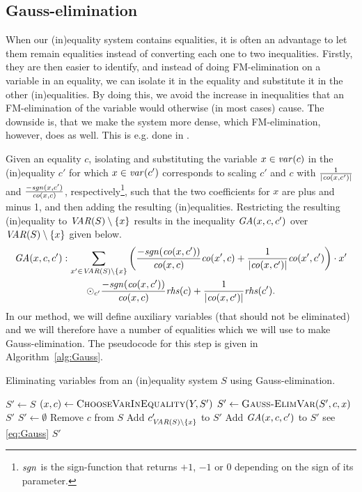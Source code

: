 \subsection{Gauss-elimination}
When our (in)equality system contains equalities, it is often an advantage to let them remain equalities instead of converting each one to two inequalities. Firstly, they are then easier to identify, and instead of doing FM-elimination on a variable in an equality, we can isolate it in the equality and substitute it in the other (in)equalities. By doing this, we avoid the increase in inequalities that an FM-elimination of the variable would otherwise (in most cases) cause. The downside is, that we make the system more dense, which FM-elimination, however, does as well. This is e.g. done in \cite{simon05}.

Given an equality $c$, isolating and substituting the variable $x\in \mathit{var}(c)$ in the (in)equality $c'$ for which $x\in\mathit{var}(c')$  
corresponds to scaling $c'$ and $c$ with $\frac{1}{|\mathit{co}(x,c')|}$ and $\frac{-\mathit{sgn}(x,c')}{\mathit{co}(x,c)}$, respectively\footnote{$\mathit{sgn}$ is the sign-function that returns $+1$, $-1$ or $0$ depending on the sign of its parameter.}, such that the two coefficients for $x$ are plus and minus 1, and then adding the resulting (in)equalities. Restricting the resulting (in)equality to $\mathit{VAR}(S)\setminus\{x\}$ results in the inequality $\mathit{GA}(x,c,c')$ over $\mathit{VAR}(S)\setminus\{x\}$ given below.
\begin{multline}
\label{eq:Gauss}
\mathit{GA}(x,c,c'):
\sum_{x'\in\mathit{VAR}(S)\setminus\{x\}}
\left(  \frac{-\mathit{sgn}(\mathit{co}(x, c'))}{\mathit{co}(x,c)}\mathit{co}(x',c) 
+ \frac{1}{|\mathit{co}(x, c')|}\mathit{co}(x',c')\right)\cdot x' \\
\odot_{c'} \frac{-\mathit{sgn}(\mathit{co}(x, c'))}{\mathit{co}(x,c)}\mathit{rhs}(c)+ \frac{1}{|\mathit{co}(x,c')|}\mathit{rhs}(c').
\end{multline} 
%
In our method, we will define auxiliary variables (that should not be eliminated) and we will therefore have a number of equalities which we will use to make Gauss-elimination. The pseudocode for this step is given in Algorithm~\ref{alg:Gauss}.
\begin{algorithm}[htbp]
\caption{Eliminating variables from an (in)equality system $S$ using Gauss-elimination.}\label{alg:Gauss}
\begin{algorithmic}[1]
\State $S'\gets S$
	\State $(x, c) \gets \Call{ChooseVarInEquality}{Y,S'}$ 
	\State $S'\gets \Call{Gauss-ElimVar}{S', c, x}$
\EndWhile
\State\Return $S'$
\Statex
{}
	\State $S'\gets \emptyset$
	\State Remove $c$ from $S$
			\State Add $c'_{\mathit{VAR}(S)\setminus\{x\}}$ to $S'$
		\Else
			\State Add $\mathit{GA}(x,c,c')$ to $S'$ \Comment see \eqref{eq:Gauss}
		\EndIf
	\EndFor
	\State \Return $S'$ 
\EndFunction
\EndFunction
\end{algorithmic}
\end{algorithm}
